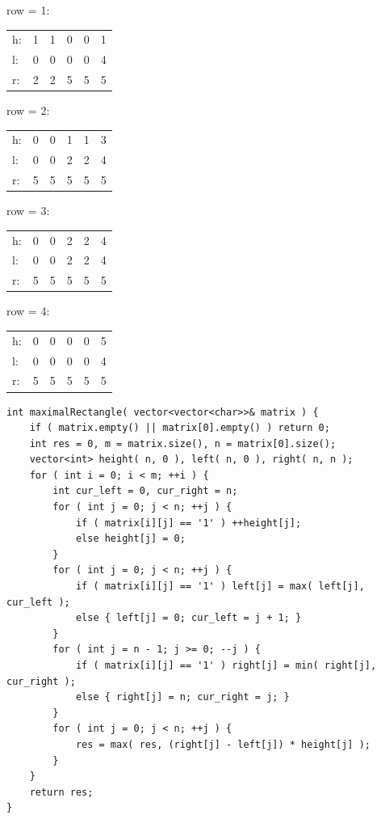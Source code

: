 \documentclass[12pt,a4paper]{article}
\begin{document}
\begin{center}
row = 1:
\begin{tabular}{l*{5}{c}}
h: & 1 & 1 & 0 & 0 & 1 \\
l: & 0 & 0 & 0 & 0 & 4 \\
r: & 2 & 2 & 5 & 5 & 5 
\end{tabular}
\end{center}
\begin{center}
row = 2:
\begin{tabular}{l*{5}{c}}
h: & 0 & 0 & 1 & 1 & 3 \\
l: & 0 & 0 & 2 & 2 & 4 \\
r: & 5 & 5 & 5 & 5 & 5 
\end{tabular}
\end{center}
\begin{center}
row = 3:
\begin{tabular}{l*{5}{c}}
h: & 0 & 0 & 2 & 2 & 4 \\
l: & 0 & 0 & 2 & 2 & 4 \\
r: & 5 & 5 & 5 & 5 & 5 
\end{tabular}
\end{center}
\begin{center}
row = 4:
\begin{tabular}{l*{5}{c}}
h: & 0 & 0 & 0 & 0 & 5 \\
l: & 0 & 0 & 0 & 0 & 4 \\
r: & 5 & 5 & 5 & 5 & 5 
\end{tabular}
\end{center}
\begin{lstlisting}
int maximalRectangle( vector<vector<char>>& matrix ) {
	if ( matrix.empty() || matrix[0].empty() ) return 0;
	int res = 0, m = matrix.size(), n = matrix[0].size();
	vector<int> height( n, 0 ), left( n, 0 ), right( n, n );
	for ( int i = 0; i < m; ++i ) {
		int cur_left = 0, cur_right = n;
		for ( int j = 0; j < n; ++j ) {
			if ( matrix[i][j] == '1' ) ++height[j];
			else height[j] = 0;
		}
		for ( int j = 0; j < n; ++j ) {
			if ( matrix[i][j] == '1' ) left[j] = max( left[j], cur_left );
			else { left[j] = 0; cur_left = j + 1; }
		}
		for ( int j = n - 1; j >= 0; --j ) {
			if ( matrix[i][j] == '1' ) right[j] = min( right[j], cur_right );
			else { right[j] = n; cur_right = j; }
		}
		for ( int j = 0; j < n; ++j ) {
			res = max( res, (right[j] - left[j]) * height[j] );
		}
	}
	return res;
}
\end{lstlisting}
\end{document}
